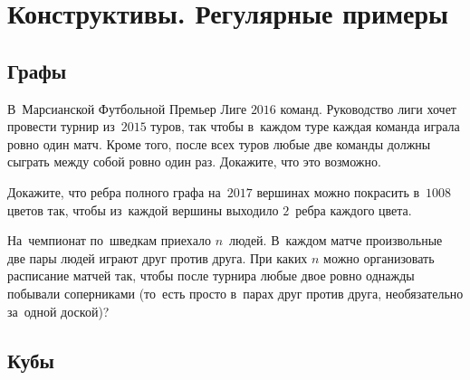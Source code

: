 
\section*{Конструктивы. Регулярные примеры}


\subsection*{Графы}

\begin{problems}

\item
В~Марсианской Футбольной Премьер Лиге $2016$ команд.
Руководство лиги хочет провести турнир из~$2015$ туров, так чтобы в~каждом туре
каждая команда играла ровно один матч.
Кроме того, после всех туров любые две команды должны сыграть между собой ровно
один раз.
Докажите, что это возможно.

\item
Докажите, что ребра полного графа на~$2017$ вершинах можно покрасить
в~$1008$ цветов так, чтобы из~каждой вершины выходило $2$~ребра каждого цвета.

\item
На~чемпионат по~шведкам приехало $n$~людей.
В~каждом матче произвольные две пары людей играют друг против друга.
При каких $n$ можно организовать расписание матчей так, чтобы после турнира
любые двое ровно однажды побывали соперниками
(то~есть просто в~парах друг против друга, необязательно за~одной доской)?

\end{problems}

\subsection*{Кубы}

